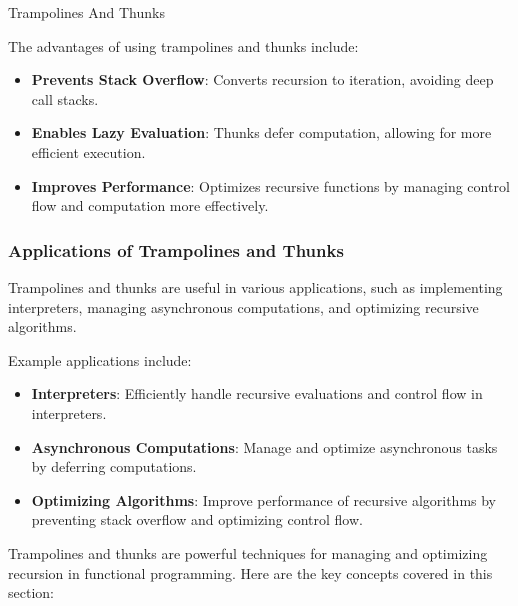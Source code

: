 \begin{notes}{Trampolines And Thunks}
\begin{highlight}
        The advantages of using trampolines and thunks include:
    
        \begin{itemize}
            \item \textbf{Prevents Stack Overflow}: Converts recursion to iteration, avoiding deep call stacks.
            \item \textbf{Enables Lazy Evaluation}: Thunks defer computation, allowing for more efficient execution.
            \item \textbf{Improves Performance}: Optimizes recursive functions by managing control flow and computation more effectively.
        \end{itemize}
    
    \end{highlight}
    
    \subsubsection*{Applications of Trampolines and Thunks}
    
    Trampolines and thunks are useful in various applications, such as implementing interpreters, managing asynchronous computations, and optimizing recursive algorithms.
    
    \begin{highlight}
    
        Example applications include:
    
        \begin{itemize}
            \item \textbf{Interpreters}: Efficiently handle recursive evaluations and control flow in interpreters.
            \item \textbf{Asynchronous Computations}: Manage and optimize asynchronous tasks by deferring computations.
            \item \textbf{Optimizing Algorithms}: Improve performance of recursive algorithms by preventing stack overflow and optimizing control flow.
        \end{itemize}
    
    \end{highlight}
    
    \begin{highlight}
    
        Trampolines and thunks are powerful techniques for managing and optimizing recursion in functional programming. Here are the key concepts covered in this section:
    

\end{highlight}
\end{notes}
